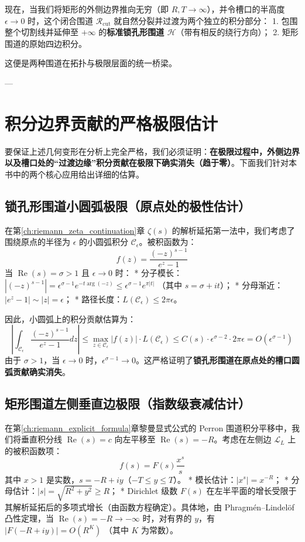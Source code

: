 现在，当我们将矩形的外侧边界推向无穷（即 $R, T \to \infty$），并令槽口的半高度 $\epsilon \to 0$ 时，这个闭合围道 $\mathcal{R}_{\text{cut}}$ 就自然分裂并过渡为两个独立的积分部分：
1. 包围整个切割线并延伸至 $+\infty$ 的\textbf{标准锁孔形围道 $\mathcal{H}$}（带有相反的绕行方向）；
2. 矩形围道的原始四边积分。

这便是两种围道在拓扑与极限层面的统一桥梁。

---

\section{积分边界贡献的严格极限估计}

要保证上述几何变形在分析上完全严格，我们必须证明：\textbf{在极限过程中，外侧边界以及槽口处的“过渡边缘”积分贡献在极限下确实消失（趋于零）}。下面我们针对本书中的两个核心应用给出详细的估算。

\subsection{锁孔形围道小圆弧极限（原点处的极性估计）}

在第\ref{ch:riemann_zeta_continuation}章 $\zeta(s)$ 的解析延拓第一法中，我们考虑了围绕原点的半径为 $\epsilon$ 的小圆弧积分 $\mathcal{C}_\epsilon$。被积函数为：
\[
  f(z) = \frac{(-z)^{s-1}}{e^z - 1}
\]
当 $\operatorname{Re}(s) = \sigma > 1$ 且 $\epsilon \to 0$ 时：
* 分子模长：$|(-z)^{s-1}| = \epsilon^{\sigma - 1} e^{-t \arg(-z)} \le \epsilon^{\sigma - 1} e^{\pi |t|}$ （其中 $s = \sigma + it$）；
* 分母渐近：$|e^z - 1| \sim |z| = \epsilon$；
* 路径长度：$L(\mathcal{C}_\epsilon) \le 2\pi \epsilon$。

因此，小圆弧上的积分贡献估算为：
\begin{equation}
    \left| \int_{\mathcal{C}_\epsilon} \frac{(-z)^{s-1}}{e^z - 1} dz \right| \le \max_{z\in\mathcal{C}_\epsilon} |f(z)| \cdot L(\mathcal{C}_\epsilon) \le C(s) \cdot \epsilon^{\sigma - 2} \cdot 2\pi \epsilon = O(\epsilon^{\sigma - 1})
\end{equation}
由于 $\sigma > 1$，当 $\epsilon \to 0$ 时，$\epsilon^{\sigma - 1} \to 0$。这严格证明了\textbf{锁孔形围道在原点处的槽口圆弧贡献确实消失}。

\subsection{矩形围道左侧垂直边极限（指数级衰减估计）}

在第\ref{ch:riemann_explicit_formula}章黎曼显式公式的 Perron 围道积分平移中，我们将垂直积分线 $\operatorname{Re}(s)=c$ 向左平移至 $\operatorname{Re}(s)=-R$。考虑在左侧边 $\mathcal{L}_L$ 上的被积函数项：
\[
  f(s) = F(s) \frac{x^s}{s}
\]
其中 $x > 1$ 是实数，$s = -R + iy$（$-T \le y \le T$）。
* 模长估计：$|x^s| = x^{-R}$；
* 分母估计：$|s| = \sqrt{R^2 + y^2} \ge R$；
* Dirichlet 级数 $F(s)$ 在左半平面的增长受限于其解析延拓后的多项式增长（由函数方程确定）。具体地，由 Phragmén--Lindelöf 凸性定理，当 $\operatorname{Re}(s) = -R \to -\infty$ 时，对有界的 $y$，有 $|F(-R+iy)| = O(R^K)$ （其中 $K$ 为常数）。

